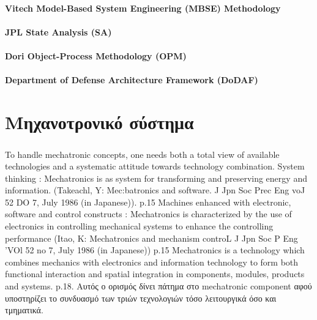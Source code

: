 \documentclass[a4paper,12pt,twoside]{report}
\begin{document}
{			\subsubsection{Vitech Model-Based System Engineering (MBSE) Methodology}
			\subsubsection{JPL State Analysis (SA)}
			\subsubsection{Dori Object-Process Methodology (OPM)}
			\subsubsection{Department of Defense Architecture Framework (DoDAF)}


	\chapter{Μηχανοτρονικό σύστημα}
		\label{κεφ.:Μηχανοτρονικό σύστημα}

			\paragraph{} {To handle mechatronic concepts, one needs both a total view of available technologies and a systematic attitude towards technology combination. \cite{ATheoreticalApproachOnMechatronicsDesign:Buur1990}
			\linebreak
			System thinking : Mechatronics is as system for transforming and preserving energy and information. (Takeachl, Y: Mec:batronics and software. J Jpn Soc Prec Eng voJ 52 DO 7, July 1986 (in Japanese)). \cite{ATheoreticalApproachOnMechatronicsDesign:Buur1990} p.15
			\linebreak
			Machines enhanced with electronic, software and control constructs : Mechatronics is characterized by the use of electronics in controlling mechanical systems to enhance the controlling performance (Itao, K: Mechatronics and mechanism controL J Jpn Soc P Eng 'VOl 52 no 7, July 1986 (in Japanese)) \cite{ATheoreticalApproachOnMechatronicsDesign:Buur1990} p.15
			\linebreak
			Mechatronics is a technology which combines mechanics with electronics and information technology to form both functional interaction and spatial integration in components, modules, products and systems.\cite{ATheoreticalApproachOnMechatronicsDesign:Buur1990} p.18. Αυτός ο ορισμός δίνει πάτημα στο mechatronic component αφού υποστηρίζει το συνδυασμό των τριών τεχνολογιών τόσο λειτουργικά όσο και τμηματικά.
			}
			
}
\end{document}
